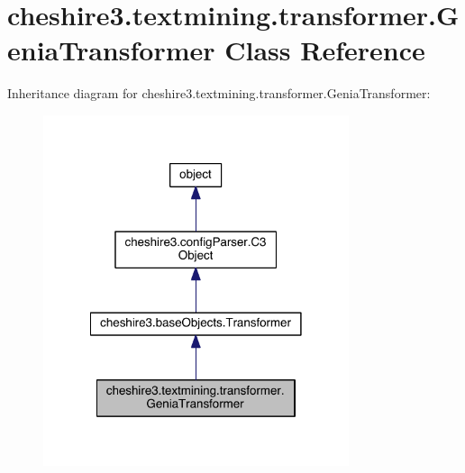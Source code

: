 \hypertarget{classcheshire3_1_1textmining_1_1transformer_1_1_genia_transformer}{\section{cheshire3.\-textmining.\-transformer.\-Genia\-Transformer Class Reference}
\label{classcheshire3_1_1textmining_1_1transformer_1_1_genia_transformer}
}


Inheritance diagram for cheshire3.\-textmining.\-transformer.\-Genia\-Transformer\-:
\nopagebreak
\begin{figure}[H]
\begin{center}
\leavevmode
\includegraphics[width=254pt]{classcheshire3_1_1textmining_1_1transformer_1_1_genia_transformer__inherit__graph}
\end{center}
\end{figure}


